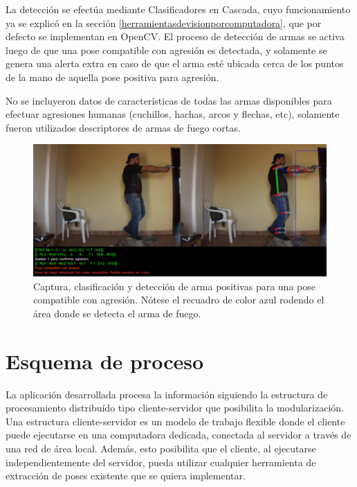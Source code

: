 \documentclass[a4paper,12pt,oneside,spanish]{book}
\begin{document}
La detección se efectúa mediante Clasificadores en Cascada, cuyo funcionamiento ya se explicó en la sección \ref{herramientasdevisionporcomputadora}, que por defecto se implementan en OpenCV. El proceso de detección de armas se activa luego de que una pose compatible con agresión es detectada, y solamente se genera una alerta extra en caso de que el arma esté ubicada cerca de los puntos de la mano de aquella pose positiva para agresión.\par

No se incluyeron datos de características de todas las armas disponibles para efectuar agresiones humanas (cuchillos, hachas, arcos y flechas, etc), solamente fueron utilizados descriptores de armas de fuego cortas.\par

\vspace*{1cm}

\begin{figure}[h!]
	\includegraphics[width=450pt]{Imagenes/positiveresult.jpg}
	\centering	
	\caption{Captura, clasificación y detección de arma positivas para una pose compatible con agresión. Nótese el recuadro de color azul rodendo el área donde se detecta el arma de fuego.}
	\label{fig:code1}
\end{figure}

\section{Esquema de proceso}\label{processschema}
La aplicación desarrollada procesa la información siguiendo la estructura de procesamiento distribuído tipo cliente-servidor que posibilita la modularización. Una estructura cliente-servidor es un modelo de trabajo flexible donde el cliente puede ejecutarse en una computadora dedicada, conectada al servidor a través de una red de área local. Además, esto posibilita que el cliente, al ejecutarse independientemente del servidor, pueda utilizar cualquier herramienta de extracción de poses existente que se quiera implementar. \par
\end{document}
